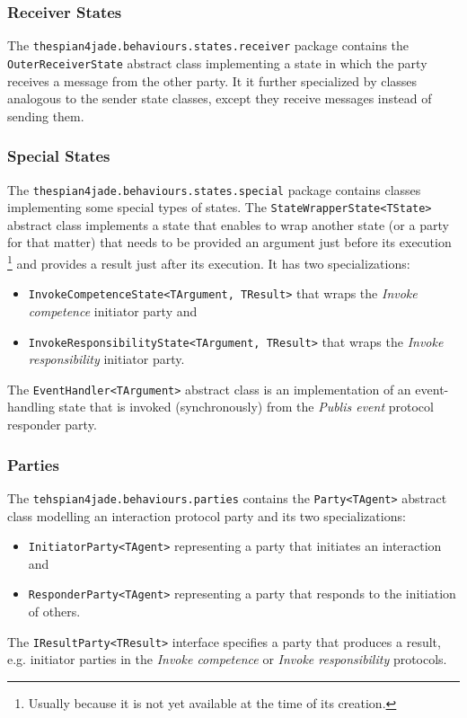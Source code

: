 \subsubsection*{Receiver States}

The \texttt{thespian4jade.behaviours.states.receiver} package contains the \texttt{OuterReceiverState} abstract class implementing a state in which the party receives a message from the other party.
It it further specialized by classes analogous to the sender state classes, except they receive messages instead of sending them.

\subsubsection*{Special States}

The \texttt{thespian4jade.behaviours.states.special} package contains classes implementing some special types of states.
The \texttt{StateWrapperState<TState>} abstract class implements a state that enables to wrap another state (or a party for that matter) that needs to be provided an argument just before its execution
\footnote{Usually because it is not yet available at the time of its creation.}
and provides a result just after its execution.
It has two specializations:
\begin{itemize}
	\item \texttt{InvokeCompetenceState<TArgument, TResult>} that wraps the \textit{Invoke competence} initiator party and
	\item \texttt{InvokeResponsibilityState<TArgument, TResult>} that wraps the \textit{Invoke responsibility} initiator party.
\end{itemize}

The \texttt{EventHandler<TArgument>} abstract class is an implementation of an event-handling state that is invoked (synchronously) from the \textit{Publis event} protocol responder party.

\subsubsection{Parties}

The \texttt{tehspian4jade.behaviours.parties} contains the \texttt{Party<TAgent>} abstract class modelling an interaction protocol party and its two specializations:
\begin{itemize}
	\item \texttt{InitiatorParty<TAgent>} representing a party that initiates an interaction and
	\item \texttt{ResponderParty<TAgent>} representing a party that responds to the initiation of others.
\end{itemize}
The \texttt{IResultParty<TResult>} interface specifies a party that produces a result, e.g. initiator parties in the \textit{Invoke competence} or \textit{Invoke responsibility} protocols.

